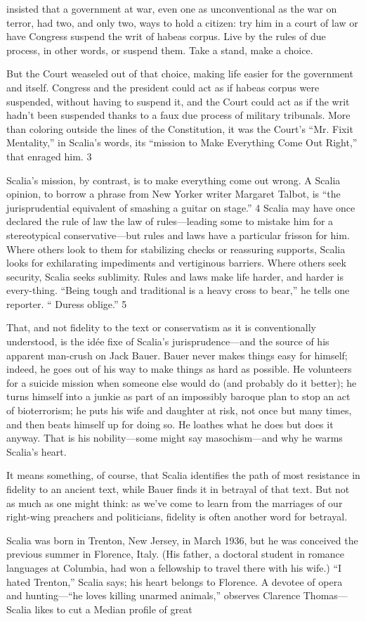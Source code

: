 insisted that a government at war, even one as unconventional as the war on terror, had two, and only two, ways to hold a citizen: try him in a court of law or have Congress suspend the writ of habeas corpus. Live by the rules of due process, in other words, or suspend them. Take a stand, make a choice.{\par} But the Court weaseled out of that choice, making life easier for the government and itself. Congress and the president could act as if habeas corpus were suspended, without having to suspend it, and the Court could act as if the writ hadn’t been suspended thanks to a faux due process of military tribunals. More than coloring outside the lines of the Constitution, it was the Court’s “Mr. Fixit Mentality,” in Scalia’s words, its “mission to Make Everything Come Out Right,” that enraged him. {\color{blue} 3 } {\par} Scalia’s mission, by contrast, is to make everything come out wrong. A Scalia opinion, to borrow a phrase from New Yorker writer Margaret Talbot, is “the jurisprudential equivalent of smashing a guitar on stage.” {\color{blue} 4 } Scalia may have once declared the rule of law the law of rules—leading some to mistake him for a stereotypical conservative—but rules and laws have a particular frisson for him. Where others look to them for stabilizing checks or reassuring supports, Scalia looks for exhilarating impediments and vertiginous barriers. Where others seek security, Scalia seeks sublimity. Rules and laws make life harder, and harder is every-thing. “Being tough and traditional is a heavy cross to bear,” he tells one reporter. “ Duress oblige.” {\color{blue} 5 } {\par} That, and not fidelity to the text or conservatism as it is conventionally understood, is the idée fixe of Scalia’s jurisprudence—and the source of his apparent man-crush on Jack Bauer. Bauer never makes things easy for himself; indeed, he goes out of his way to make things as hard as possible. He volunteers for a suicide mission when someone else would do (and probably do it better); he turns himself into a junkie as part of an impossibly baroque plan to stop an act of bioterrorism; he puts his wife and daughter at risk, not once but many times, and then beats himself up for doing so. He loathes what he does but does it anyway. That is his nobility—some might say masochism—and why he warms Scalia’s heart.{\par} It means something, of course, that Scalia identifies the path of most resistance in fidelity to an ancient text, while Bauer finds it in betrayal of that text. But not as much as one might think: as we’ve come to learn from the marriages of our right-wing preachers and politicians, fidelity is often another word for betrayal.{\par} Scalia was born in Trenton, New Jersey, in March 1936, but he was conceived the previous summer in Florence, Italy. (His father, a doctoral student in romance languages at Columbia, had won a fellowship to travel there with his wife.) “I hated Trenton,” Scalia says; his heart belongs to Florence. A devotee of opera and hunting—“he loves killing unarmed animals,” observes Clarence Thomas—Scalia likes to cut a Median profile of great 